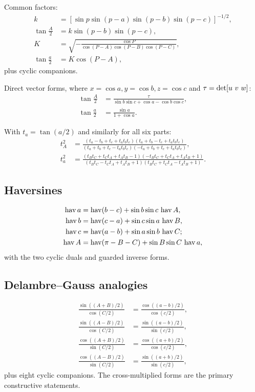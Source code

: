 Common factors:
\begin{align*}
k&=[\sin p\sin(p-a)\sin(p-b)\sin(p-c)]^{-1/2},\\
\tan\frac A2&=k\sin(p-b)\sin(p-c),\\
K&=\sqrt{-\frac{\cos P}{\cos(P-A)\cos(P-B)\cos(P-C)}},\\
\tan\frac a2&=K\cos(P-A),
\end{align*}
plus cyclic companions.

Direct vector forms, where
\(x=\cos a,y=\cos b,z=\cos c\) and
\(\tau=\operatorname{det}[u\ v\ w]\):
\begin{align*}
\tan\frac A2&=\frac{\tau}{\sin b\sin c+\cos a-\cos b\cos c},\\
\tan\frac a2&=\frac{\sin a}{1+\cos a}.
\end{align*}

With \(t_a=\tan(a/2)\) and similarly for all six parts:
\begin{align*}
t_A^2&=
 \frac{(t_a-t_b+t_c+t_at_bt_c)(t_a+t_b-t_c+t_at_bt_c)}
 {(t_a+t_b+t_c-t_at_bt_c)(-t_a+t_b+t_c+t_at_bt_c)},\\
t_a^2&=
 \frac{(t_Bt_C+t_Ct_A+t_At_B-1)
       (-t_Bt_C+t_Ct_A+t_At_B+1)}
 {(t_Bt_C-t_Ct_A+t_At_B+1)
       (t_Bt_C+t_Ct_A-t_At_B+1)}.
\end{align*}

\subsection{Haversines}

\begin{align*}
\operatorname{hav} a&=\operatorname{hav}(b-c)+\sin b\sin c\,\operatorname{hav} A,\\
\operatorname{hav} b&=\operatorname{hav}(c-a)+\sin c\sin a\,\operatorname{hav} B,\\
\operatorname{hav} c&=\operatorname{hav}(a-b)+\sin a\sin b\,\operatorname{hav} C;\\
\operatorname{hav} A&=\operatorname{hav}(\pi-B-C)+\sin B\sin C\,\operatorname{hav} a,
\end{align*}
with the two cyclic duals and guarded inverse forms.

\subsection{Delambre--Gauss analogies}

\begin{align*}
\frac{\sin((A+B)/2)}{\cos(C/2)}&=
 \frac{\cos((a-b)/2)}{\cos(c/2)},\\
\frac{\sin((A-B)/2)}{\cos(C/2)}&=
 \frac{\sin((a-b)/2)}{\sin(c/2)},\\
\frac{\cos((A+B)/2)}{\sin(C/2)}&=
 \frac{\cos((a+b)/2)}{\cos(c/2)},\\
\frac{\cos((A-B)/2)}{\sin(C/2)}&=
 \frac{\sin((a+b)/2)}{\sin(c/2)},
\end{align*}
plus eight cyclic companions.  The cross-multiplied forms are the primary
constructive statements.

